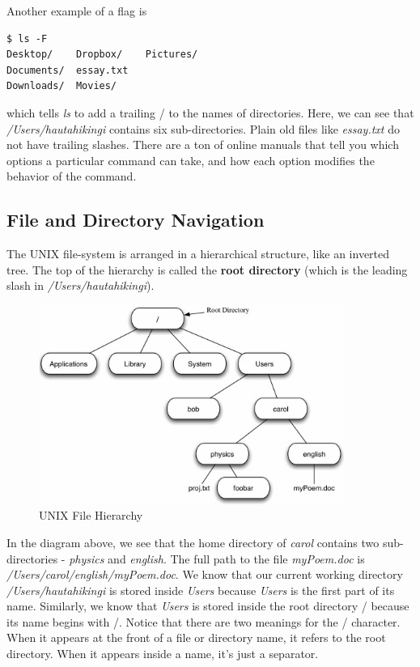 \documentclass{article}
\begin{document}
Another example of a flag is 
\begin{lstlisting}
$ ls -F				
Desktop/	Dropbox/	Pictures/
Documents/	essay.txt
Downloads/	Movies/
\end{lstlisting}
which tells \emph{ls} to add a trailing / to the names of directories. Here, we can see that \emph{/Users/hautahikingi} contains six sub-directories. Plain old files like \emph{essay.txt} do not have trailing slashes. There are a ton of online manuals that tell you which options a particular command can take, and how each option modifies the behavior of the command.

\subsection{File and Directory Navigation}

The UNIX file-system is arranged in a hierarchical structure, like an inverted tree. The top of the hierarchy is called the \textbf{root directory} (which is the leading slash in  \emph{/Users/hautahikingi}).

\begin{figure}[h!]
\centering
\caption{UNIX File Hierarchy}
\includegraphics[width=10cm]{./auxfiles/tree.jpg}
\end{figure}


In the diagram above, we see that the home directory of \emph{carol} contains two sub-directories - \emph{physics} and \emph{english}. The full path to the file \emph{myPoem.doc} is \emph{/Users/carol/english/myPoem.doc}. We know that our current working directory \emph{/Users/hautahikingi} is stored inside \emph{Users} because \emph{Users} is the first part of its name. Similarly, we know that \emph{Users} is stored inside the root directory / because its name begins with /. Notice that there are two meanings for the / character. When it appears at the front of a file or directory name, it refers to the root directory. When it appears inside a name, it's just a separator.\\
\end{document}
